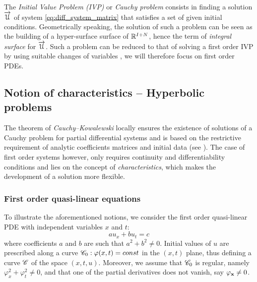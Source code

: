 The \textit{Initial Value Problem (IVP)} or \textit{Cauchy problem} consists in finding a solution ${\overrightarrow{\mathcal{U}}}$ of system \eqref{eq:diff_system_matrix} that satisfies a set of given initial conditions. Geometrically speaking, the solution of such a problem can be seen as the building of a hyper-surface surface of $\mathbb{R}^{I+N}$, hence the term of \textit{integral surface} for ${\overrightarrow{\mathcal{U}}}$. Such a problem can be reduced to that of solving a first order IVP by using suitable changes of variables \cite[p.54]{PDEs}, we will therefore focus on first order PDEs.

\subsection{Notion of characteristics -- Hyperbolic problems}
The theorem of \textit{Cauchy--Kowalewski} locally ensures the existence of solutions of a Cauchy problem for partial differential systems and is based on the restrictive requirement of analytic coefficients matrices and initial data (see \cite[p.46]{PDEs}). The case of first order systems however, only requires continuity and differentiability conditions and lies on the concept of \textit{characteristics}, which makes the development of a solution more flexible.

\subsubsection*{First order quasi-linear equations}
To illustrate the aforementioned notions, we consider the first order quasi-linear PDE with independent variables $x$ and $t$:
\begin{equation}
  \label{eq:1st_order_pde}
   a u_x + b u_t  = c
\end{equation}
where coefficients $a$ and $b$ are such that $a^2 + b^2 \neq 0$. Initial values of $u$ are prescribed along a curve $\mathscr{C}_0:\varphi(x,t)=const$ in the $(x,t)$ plane, thus defining a curve $\mathscr{C}$ of the space $(x,t,u)$.
Moreover, we assume that $\mathscr{C}_0$ is regular, namely $\varphi_x^2 + \varphi_t^2 \neq 0$, and that one of the partial derivatives does not vanish, say $\varphi_{\mathbf{x}} \neq 0$.

